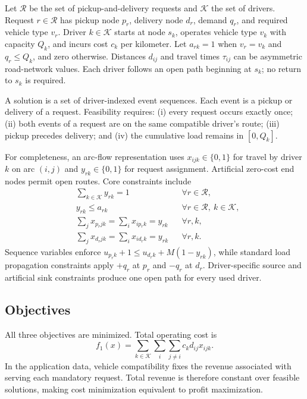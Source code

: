 \documentclass[11pt,a4paper]{article}
\newcommand{\R}{\mathcal{R}}
\newcommand{\K}{\mathcal{K}}
\begin{document}
Let $\R$ be the set of pickup-and-delivery requests and $\K$ the set of drivers. Request $r\in\R$ has pickup node $p_r$, delivery node $d_r$, demand $q_r$, and required vehicle type $v_r$. Driver $k\in\K$ starts at node $s_k$, operates vehicle type $v_k$ with capacity $Q_k$, and incurs cost $c_k$ per kilometer. Let $a_{rk}=1$ when $v_r=v_k$ and $q_r\le Q_k$, and zero otherwise. Distances $d_{ij}$ and travel times $\tau_{ij}$ can be asymmetric road-network values. Each driver follows an open path beginning at $s_k$; no return to $s_k$ is required.

A solution is a set of driver-indexed event sequences. Each event is a pickup or delivery of a request. Feasibility requires: (i) every request occurs exactly once; (ii) both events of a request are on the same compatible driver's route; (iii) pickup precedes delivery; and (iv) the cumulative load remains in $[0,Q_k]$.

For completeness, an arc-flow representation uses $x_{ijk}\in\{0,1\}$ for travel by driver $k$ on arc $(i,j)$ and $y_{rk}\in\{0,1\}$ for request assignment. Artificial zero-cost end nodes permit open routes. Core constraints include
\begin{align}
  &\sum_{k\in\K}y_{rk}=1 &&\forall r\in\R, \\
  &y_{rk}\le a_{rk} &&\forall r\in\R,\ k\in\K, \\
  &\sum_j x_{p_rjk}=\sum_i x_{ip_rk}=y_{rk} &&\forall r,k, \\
  &\sum_j x_{d_rjk}=\sum_i x_{id_rk}=y_{rk} &&\forall r,k.
\end{align}
Sequence variables enforce $u_{p_rk}+1\le u_{d_rk}+M(1-y_{rk})$, while standard load propagation constraints apply $+q_r$ at $p_r$ and $-q_r$ at $d_r$. Driver-specific source and artificial sink constraints produce one open path for every used driver.

\subsection{Objectives}

All three objectives are minimized. Total operating cost is
\begin{equation}
 f_1(x)=\sum_{k\in\K}\sum_{i}\sum_{j\ne i} c_k d_{ij}x_{ijk}.
\end{equation}
In the application data, vehicle compatibility fixes the revenue associated with serving each mandatory request. Total revenue is therefore constant over feasible solutions, making cost minimization equivalent to profit maximization.
\end{document}
